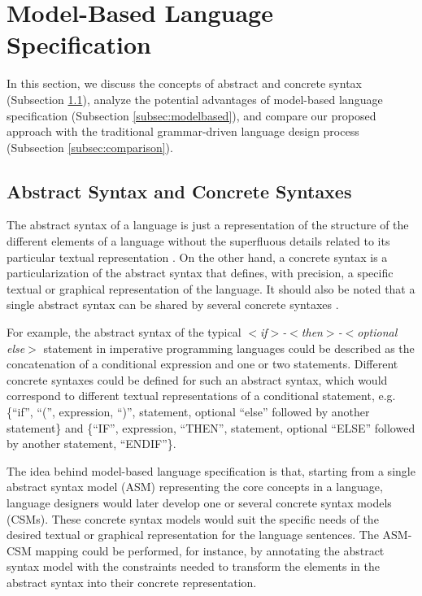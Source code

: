 \documentclass[preprint]{elsarticle}
\begin{document}
\section{Model-Based Language Specification} \label{sec:modelbased}

In this section, we discuss the concepts of abstract and concrete syntax (Subsection \ref{subsec:asmcsm}), analyze the potential advantages of model-based language specification (Subsection \ref{subsec:modelbased}), and compare our proposed approach with the traditional grammar-driven language design process (Subsection \ref{subsec:comparison}).

\subsection{Abstract Syntax and Concrete Syntaxes} \label{subsec:asmcsm}

The abstract syntax of a language is just a representation of the structure of the different elements of a language without the superfluous details related to its particular textual representation \cite{Kleppe2007}.
On the other hand, a concrete syntax is a particularization of the abstract syntax that defines, with precision, a specific textual or graphical representation of the language.
It should also be noted that a single abstract syntax can be shared by several concrete syntaxes \cite{Kleppe2007}.

For example, the abstract syntax of the typical \emph{$<$if$>$-$<$then$>$-$<$optional else$>$} statement in imperative programming languages could be described as the concatenation of a conditional expression and one or two statements.
Different concrete syntaxes could be defined for such an abstract syntax, which would correspond to different textual representations of a conditional statement, e.g. \{``if'', ``('', expression, ``)'', statement, optional ``else'' followed by another statement\} and \{``IF'', expression, ``THEN'', statement, optional ``ELSE'' followed by another statement, ``ENDIF''\}.

The idea behind model-based language specification is that, starting from a single abstract syntax model (ASM) representing the core concepts in a language, language designers would later develop one or several concrete syntax models (CSMs).
These concrete syntax models would suit the specific needs of the desired textual or graphical representation for the language sentences.
The ASM-CSM mapping could be performed, for instance, by annotating the abstract syntax model with the constraints needed to transform the elements in the abstract syntax into their concrete representation.
\end{document}
